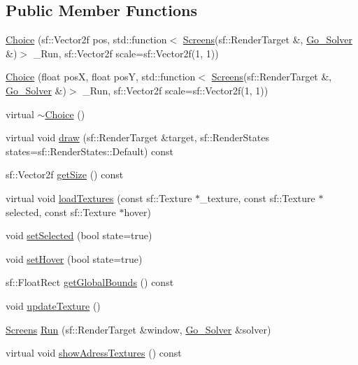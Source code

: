 \subsection*{Public Member Functions}
\begin{DoxyCompactItemize}
\item 
\hyperlink{class_choice_aeea62a8f913a1aebdf6426a70b99813d}{Choice} (sf\+::\+Vector2f pos, std\+::function$<$ \hyperlink{_globals_8h_a3d5776bab98402b03be09156bacf4f68}{Screens}(sf\+::\+Render\+Target \&, \hyperlink{class_go___solver}{Go\+\_\+\+Solver} \&)$>$ \+\_\+\+Run, sf\+::\+Vector2f scale=sf\+::\+Vector2f(1, 1))
\item 
\hyperlink{class_choice_a72be01644a7ac52a0eaa2c34d9842686}{Choice} (float posX, float posY, std\+::function$<$ \hyperlink{_globals_8h_a3d5776bab98402b03be09156bacf4f68}{Screens}(sf\+::\+Render\+Target \&, \hyperlink{class_go___solver}{Go\+\_\+\+Solver} \&)$>$ \+\_\+\+Run, sf\+::\+Vector2f scale=sf\+::\+Vector2f(1, 1))
\item 
virtual \hyperlink{class_choice_ac60418c9d38713ccef3cb0dd1f14a083}{$\sim$\+Choice} ()
\item 
virtual void \hyperlink{class_choice_ad6a03ce8c892eacabef3691feba37b0f}{draw} (sf\+::\+Render\+Target \&target, sf\+::\+Render\+States states=sf\+::\+Render\+States\+::\+Default) const
\item 
sf\+::\+Vector2f \hyperlink{class_choice_ad013aa52558a29430889b9c6e9c0a1ab}{get\+Size} () const
\item 
virtual void \hyperlink{class_choice_a70d994feb4c3215eb477bae3df7c5052}{load\+Textures} (const sf\+::\+Texture $\ast$\+\_\+texture, const sf\+::\+Texture $\ast$selected, const sf\+::\+Texture $\ast$hover)
\item 
void \hyperlink{class_choice_aa4bbe520ca9f933327fc1f678d6626f8}{set\+Selected} (bool state=true)
\item 
void \hyperlink{class_choice_a377e5d456c5c7c7e8914af52cf184a3a}{set\+Hover} (bool state=true)
\item 
sf\+::\+Float\+Rect \hyperlink{class_choice_a8b901a892c521edcdb02c49c5bd057a8}{get\+Global\+Bounds} () const
\item 
void \hyperlink{class_choice_aa3113d895017610a03fff73795cf22fd}{update\+Texture} ()
\item 
\hyperlink{_globals_8h_a3d5776bab98402b03be09156bacf4f68}{Screens} \hyperlink{class_choice_a4b8be200875261610f5a638a6e26ccf2}{Run} (sf\+::\+Render\+Target \&window, \hyperlink{class_go___solver}{Go\+\_\+\+Solver} \&solver)
\item 
virtual void \hyperlink{class_choice_ad29163ceee43a59dba6ea46452ca46c0}{show\+Adress\+Textures} () const
\end{DoxyCompactItemize}


